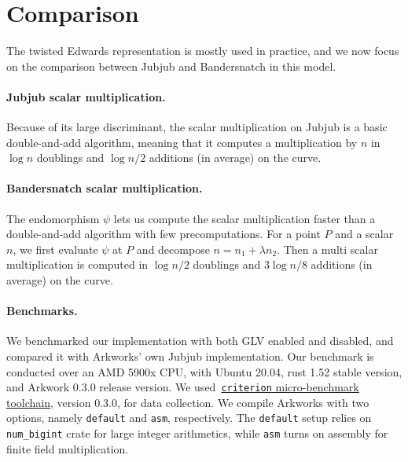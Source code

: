 \documentclass{article}
\newcommand{\SM}[1]{\color{blue}#1\color{black}}
\newcommand{\ZZ}[1]{\color{cyan}#1\color{black}}
\theoremstyle{definition}
\begin{document}

\section{Comparison}\label{sec:comparison}


The twisted Edwards representation is mostly used in practice, and we
now focus on the comparison between Jubjub and Bandersnatch in this
model.

\paragraph{Jubjub scalar multiplication.}
Because of its large discriminant, the scalar multiplication on Jubjub
is a basic double-and-add algorithm, meaning that it computes a
multiplication by $n$ in $\log n$ doublings and $\log n/2$
additions (in average) on the curve. 

\paragraph{Bandersnatch scalar multiplication.}
The endomorphism $\psi$ lets us compute the scalar multiplication
faster than a double-and-add algorithm with few precomputations. For a
point $P$ and a scalar $n$, we first evaluate $\psi$ at $P$ and
decompose $n = n_1 + \lambda n_2$. Then a multi scalar multiplication
is computed in $\log n/2$ doublings and $3\log n/8$ additions (in average) on the curve.

\paragraph{Benchmarks.}
We benchmarked our implementation with both GLV enabled and disabled, and 
compared it with Arkworks' own Jubjub implementation. 
Our benchmark is conducted over an AMD 5900x CPU, with Ubuntu 20.04,
rust 1.52 stable version, and Arkwork 0.3.0 release version.
We used~\href{https://docs.rs/criterion}{\texttt{criterion}
  micro-benchmark toolchain},  version 0.3.0, for data collection. We
compile Arkworks with two options, namely \texttt{default} and
\texttt{asm}, respectively.
The \texttt{default} setup relies on \texttt{num\_bigint} crate for
large integer arithmetics, while \texttt{asm} turns on assembly for
finite field multiplication. 
\end{document}
